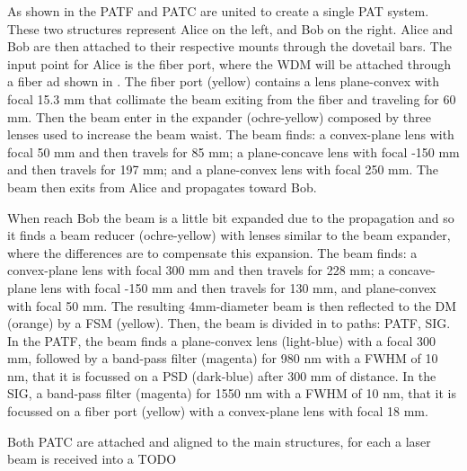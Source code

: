 
As shown in the  PATF and PATC are united to create a single PAT system. These two structures represent Alice on the left, and Bob on the right. Alice and Bob are then attached to their respective mounts through the dovetail bars.
The input point for Alice is the fiber port, where the WDM will be attached through a fiber ad shown in . The fiber port (yellow) contains a lens plane-convex with focal 15.3 mm that collimate the beam exiting from the fiber and traveling for 60 mm. Then the beam enter in the expander (ochre-yellow) composed by three lenses used to increase the beam waist. The beam finds: a convex-plane lens with focal 50 mm and then travels for 85 mm; a plane-concave lens with focal -150 mm and then travels for 197 mm; and a plane-convex lens with focal 250 mm. The beam then exits from Alice and propagates toward Bob.

When reach Bob the beam is a little bit expanded due to the propagation and so it finds a beam reducer (ochre-yellow) with lenses similar to the beam expander, where the differences are to compensate this expansion. The beam finds: a convex-plane lens with focal 300 mm and then travels for 228 mm; a concave-plane lens with focal -150 mm and then travels for 130 mm, and plane-convex with focal 50 mm. The resulting 4mm-diameter beam is then reflected to the DM (orange) by a FSM (yellow). Then, the beam is divided in to paths: PATF, SIG.
In the PATF, the beam finds a plane-convex lens (light-blue) with a focal 300 mm, followed by a band-pass filter (magenta) for 980 nm with a FWHM of 10 nm, that it is focussed on a PSD (dark-blue) after 300 mm of distance.
In the SIG, a band-pass filter (magenta) for 1550 nm with a FWHM of 10 nm, that it is focussed on a fiber port (yellow) with a convex-plane lens with focal 18 mm.

Both PATC are attached and aligned to the main structures, for each a laser beam is received into a TODO

